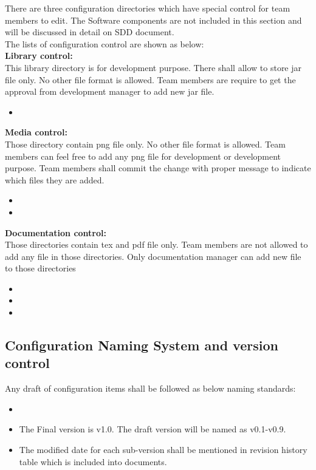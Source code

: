 There are three configuration directories which have special control for team members to edit. The Software components are not included in this section and will be discussed in detail on SDD document.\\
The lists of configuration control are shown as below:\\

\textbf{Library control:}\\
This library directory is for development purpose. There shall allow to store jar file only. No other file format is allowed. Team members are require to get the approval from development manager to add new jar file.\\ 
\begin{itemize}
	\item \texttt{}
\end{itemize}
\textbf{Media control:}\\
Those directory contain png file only. No other file format is allowed. Team members can feel free to add any png file for development or development purpose. Team members shall commit the change with proper message to indicate which files they are added.

\begin{itemize}
	\item \texttt{}
	\item \texttt{}
\end{itemize} 
\textbf{Documentation control:}\\
Those directories contain tex and pdf file only. Team members are not allowed to add any file in those directories.
Only documentation manager can add new file to those directories

\begin{itemize}
	\item \texttt{}
	\item \texttt{}
	\item \texttt{}
\end{itemize}


\subsection{Configuration Naming System and version control}
Any draft of configuration items shall be followed as below naming standards:
\begin{itemize}
	\item \texttt{}\\
      		\texttt{}
	\item The Final version is v1.0. The draft version will be named as v0.1-v0.9.
	\item The modified date for each sub-version shall be mentioned in revision history table which is included into documents.\\
\end{itemize}

